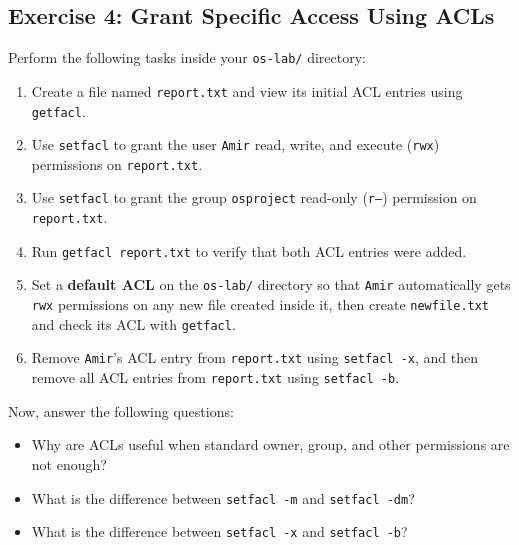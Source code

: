 \subsection{Exercise 4: Grant Specific Access Using ACLs}
Perform the following tasks inside your \texttt{os-lab/} directory:
\begin{enumerate}
	\item Create a file named \texttt{report.txt} and view its initial ACL entries using \texttt{getfacl}.
	\item Use \texttt{setfacl} to grant the user \texttt{Amir} read, write, and execute (\texttt{rwx}) permissions on \texttt{report.txt}.
	\item Use \texttt{setfacl} to grant the group \texttt{osproject} read-only (\texttt{r--}) permission on \texttt{report.txt}.
	\item Run \texttt{getfacl report.txt} to verify that both ACL entries were added.
	\item Set a \textbf{default ACL} on the \texttt{os-lab/} directory so that \texttt{Amir} automatically gets \texttt{rwx} permissions on any new file created inside it, then create \texttt{newfile.txt} and check its ACL with \texttt{getfacl}.
	\item Remove \texttt{Amir}'s ACL entry from \texttt{report.txt} using \texttt{setfacl -x}, and then remove all ACL entries from \texttt{report.txt} using \texttt{setfacl -b}.
\end{enumerate}

Now, answer the following questions:
\begin{itemize}
	\item Why are ACLs useful when standard owner, group, and other permissions are not enough?
	\item What is the difference between \texttt{setfacl -m} and \texttt{setfacl -dm}?
	\item What is the difference between \texttt{setfacl -x} and \texttt{setfacl -b}?
\end{itemize}
